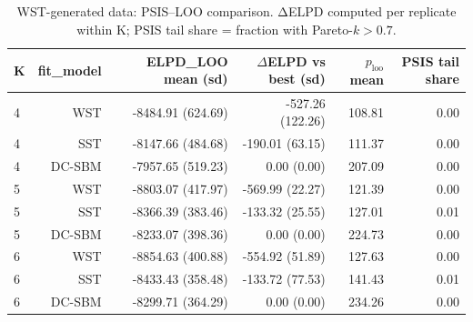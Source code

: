 \begin{table}[!h]
\centering
\caption{WST-generated data: PSIS–LOO comparison. ΔELPD computed per replicate within K; PSIS tail share = fraction with Pareto-\(k>0.7\).\\\label{tab:wst-main-psis-loo}}
\centering
\begin{tabular}[t]{lrrrrr}
\toprule
K & fit_model & ELPD\_LOO mean (sd) & $\Delta$ELPD vs best (sd) & $p_{\text{loo}}$ mean & PSIS tail share\\
\midrule
4 & WST & -8484.91 (624.69) & -527.26 (122.26) & 108.81 & 0.00\\
4 & SST & -8147.66 (484.68) & -190.01 (63.15) & 111.37 & 0.00\\
4 & DC-SBM & -7957.65 (519.23) & 0.00 (0.00) & 207.09 & 0.00\\
5 & WST & -8803.07 (417.97) & -569.99 (22.27) & 121.39 & 0.00\\
5 & SST & -8366.39 (383.46) & -133.32 (25.55) & 127.01 & 0.01\\
5 & DC-SBM & -8233.07 (398.36) & 0.00 (0.00) & 224.73 & 0.00\\
6 & WST & -8854.63 (400.88) & -554.92 (51.89) & 127.63 & 0.00\\
6 & SST & -8433.43 (358.48) & -133.72 (77.53) & 141.43 & 0.01\\
6 & DC-SBM & -8299.71 (364.29) & 0.00 (0.00) & 234.26 & 0.00\\
\bottomrule
\end{tabular}
\end{table}
